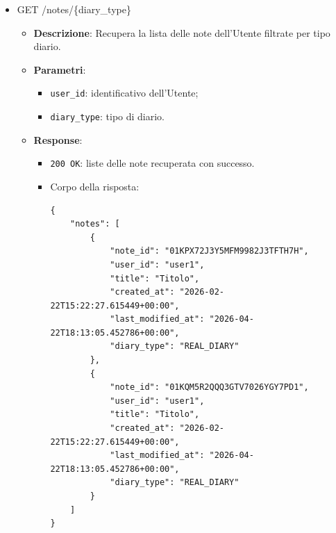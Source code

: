 \documentclass[a4paper,12pt]{article}
\newcommand{\code}[1]{{\ttfamily\textcolor{purple!85!black}{#1}}}
\begin{document}
\begin{itemize}
\begin{itemize}
            \item \textbf{Errori}:
            \begin{itemize}
                \item \texttt{400 Bad Request}: \texttt{Invalid diary\_type} (ValueError su enum DiaryType).
                \item \texttt{500 Internal Server Error}: errori di \texttt{service.add\_note}, parsing JSON non valido, campi mancanti o errori runtime non gestiti.
            \end{itemize}
        \end{itemize}

    \item \code{GET /notes/\{diary\_type\}}
        \begin{itemize}
            \item \textbf{Descrizione}: Recupera la lista delle note dell’Utente filtrate per tipo diario.

            \item \textbf{Parametri}:
            \begin{itemize}
                \item \texttt{user\_id}: identificativo dell'Utente;
                \item \texttt{diary\_type}: tipo di diario.
            \end{itemize}

            \item \textbf{Response}:
            \begin{itemize}
                \item \texttt{200 OK}: liste delle note recuperata con successo.
                \item Corpo della risposta:
\begin{verbatim}
{
    "notes": [
        {
            "note_id": "01KPX72J3Y5MFM9982J3TFTH7H",
            "user_id": "user1",
            "title": "Titolo",
            "created_at": "2026-02-22T15:22:27.615449+00:00",
            "last_modified_at": "2026-04-22T18:13:05.452786+00:00",
            "diary_type": "REAL_DIARY"
        },
        {
            "note_id": "01KQM5R2QQQ3GTV7026YGY7PD1",
            "user_id": "user1",
            "title": "Titolo",
            "created_at": "2026-02-22T15:22:27.615449+00:00",
            "last_modified_at": "2026-04-22T18:13:05.452786+00:00",
            "diary_type": "REAL_DIARY"
        }
    ]
}
\end{verbatim}
            \end{itemize}


\end{itemize}
\end{itemize}
\end{document}
